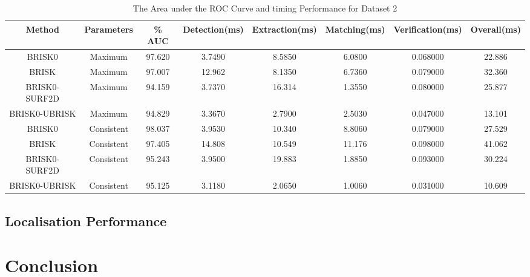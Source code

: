 \documentclass{article}
\begin{document}
\begin{table}
\caption{The Area under the ROC Curve and timing Performance for Dataset 2}
\footnotesize
\begin{tabular}{|c|c|c|c|c|c|c|c|}
\hline 
Method & Parameters & \% AUC & Detection(ms) & Extraction(ms) & Matching(ms) & Verification(ms) & Overall(ms)\tabularnewline
\hline 
\hline 
BRISK0 & Maximum & 97.620 & 3.7490 & 8.5850 & 6.0800 & 0.068000 & 22.886\tabularnewline
\hline 
BRISK & Maximum & 97.007 & 12.962 & 8.1350 & 6.7360 & 0.079000 & 32.360\tabularnewline
\hline 
BRISK0-SURF2D & Maximum & 94.159 & 3.7370 & 16.314 & 1.3550 & 0.080000 & 25.877\tabularnewline
\hline 
BRISK0-UBRISK & Maximum & 94.829 & 3.3670 & 2.7900 & 2.5030 & 0.047000 & 13.101\tabularnewline
\hline 
BRISK0 & Consistent & 98.037 & 3.9530 & 10.340 & 8.8060 & 0.079000 & 27.529\tabularnewline
\hline 
BRISK & Consistent & 97.405 & 14.808 & 10.549 & 11.176 & 0.098000 & 41.062\tabularnewline
\hline 
BRISK0-SURF2D & Consistent & 95.243 & 3.9500 & 19.883 & 1.8850 & 0.093000 & 30.224\tabularnewline
\hline 
BRISK0-UBRISK & Consistent & 95.125 & 3.1180 & 2.0650 & 1.0060 & 0.031000 & 10.609\tabularnewline
\hline 
\end{tabular}
\label{tab:rocTimingAdditional}
\end{table}




\subsection{Localisation Performance}
\label{sec:localisationPerformance}







\section{Conclusion}
\label{sec:conclusion}



%
%
 
\end{document}
